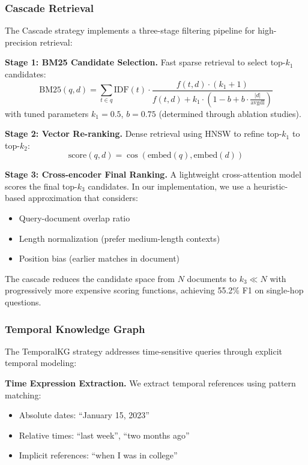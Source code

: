 \subsubsection{Cascade Retrieval}

The Cascade strategy implements a three-stage filtering pipeline for high-precision retrieval:

\textbf{Stage 1: BM25 Candidate Selection.} Fast sparse retrieval to select top-$k_1$ candidates:
\begin{equation}
\text{BM25}(q, d) = \sum_{t \in q} \text{IDF}(t) \cdot \frac{f(t,d) \cdot (k_1 + 1)}{f(t,d) + k_1 \cdot (1 - b + b \cdot \frac{|d|}{\text{avgdl}})}
\end{equation}
with tuned parameters $k_1 = 0.5$, $b = 0.75$ (determined through ablation studies).

\textbf{Stage 2: Vector Re-ranking.} Dense retrieval using HNSW to refine top-$k_1$ to top-$k_2$:
\begin{equation}
\text{score}(q, d) = \cos(\text{embed}(q), \text{embed}(d))
\end{equation}

\textbf{Stage 3: Cross-encoder Final Ranking.} A lightweight cross-attention model scores the final top-$k_3$ candidates. In our implementation, we use a heuristic-based approximation that considers:
\begin{itemize}
    \item Query-document overlap ratio
    \item Length normalization (prefer medium-length contexts)
    \item Position bias (earlier matches in document)
\end{itemize}

The cascade reduces the candidate space from $N$ documents to $k_3 \ll N$ with progressively more expensive scoring functions, achieving 55.2\% F1 on single-hop questions.

\subsubsection{Temporal Knowledge Graph}

The TemporalKG strategy addresses time-sensitive queries through explicit temporal modeling:

\textbf{Time Expression Extraction.} We extract temporal references using pattern matching:
\begin{itemize}
    \item Absolute dates: ``January 15, 2023''
    \item Relative times: ``last week'', ``two months ago''
    \item Implicit references: ``when I was in college''
\end{itemize}


